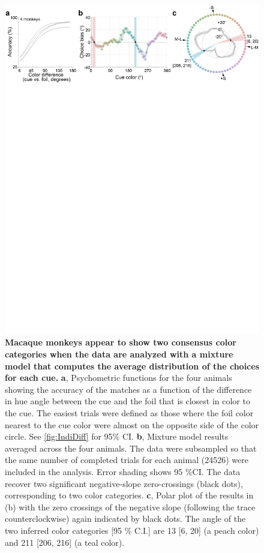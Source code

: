 \begin{figure}
    \begin{fullwidth}
    \centering
    \includegraphics[width=\textwidth+4cm,trim={0 20cm 0 0},clip]{../Figures/flat/F2_CombinedMMResults_5.jpg}
    \caption{\textbf{Macaque monkeys appear to show two consensus color categories when the data are analyzed with a mixture model that computes the average distribution of the choices for each cue.}
	\textbf{a}, Psychometric functions for the four animals showing the accuracy of the matches as a function of the difference in hue angle between the cue and the foil that is closest in color to the cue. 
	The easiest trials were defined as those where the foil color nearest to the cue color were almost on the opposite side of the color circle. See \autoref{fig:IndiDiff} for 95\% CI. 
	\textbf{b}, Mixture model results averaged across the four animals. The data were subsampled so that the same number of completed trials for each animal (24526) were included in the analysis. Error shading shows 95 \%CI. 
	The data recover two significant negative-slope zero-crossings (black dots), corresponding to two color categories. 
	\textbf{c}, Polar plot of the results in (b) with the zero crossings of the negative slope (following the trace counterclockwise) again indicated by black dots. The angle of the two inferred color categories [95 \% C.I.] are 13 [6, 20] (a peach color) and 211 [206, 216] (a teal color). }
    \label{fig:AvResults}
    \end{fullwidth}
\end{figure}


